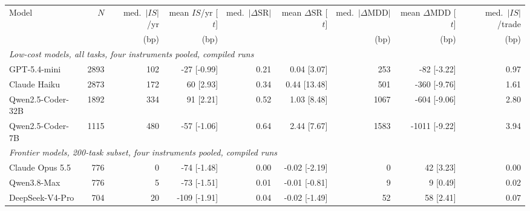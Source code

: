\begin{tabular}{lrrrrrrrr}
\toprule
Model & $N$ & med.\ $|IS|$/yr & mean $IS$/yr [$t$] & med.\ $|\Delta\mathrm{SR}|$ & mean $\Delta\mathrm{SR}$ [$t$] & med.\ $|\Delta\mathrm{MDD}|$ & mean $\Delta\mathrm{MDD}$ [$t$] & med.\ $|IS|$/trade \\
 & & (bp) & (bp) & & & (bp) & (bp) & (bp) \\
\midrule
\multicolumn{9}{l}{\emph{Low-cost models, all tasks, four instruments pooled, compiled runs}} \\
GPT-5.4-mini & 2893 & 102 & -27 [-0.99] & 0.21 & 0.04 [3.07] & 253 & -82 [-3.22] & 0.97 \\
Claude Haiku & 2873 & 172 & 60 [2.93] & 0.34 & 0.44 [13.48] & 501 & -360 [-9.76] & 1.61 \\
Qwen2.5-Coder-32B & 1892 & 334 & 91 [2.21] & 0.52 & 1.03 [8.48] & 1067 & -604 [-9.06] & 2.80 \\
Qwen2.5-Coder-7B & 1115 & 480 & -57 [-1.06] & 0.64 & 2.44 [7.67] & 1583 & -1011 [-9.22] & 3.94 \\
\midrule
\multicolumn{9}{l}{\emph{Frontier models, 200-task subset, four instruments pooled, compiled runs}} \\
Claude Opus 5.5 & 776 & 0 & -74 [-1.48] & 0.00 & -0.02 [-2.19] & 0 & 42 [3.23] & 0.00 \\
Qwen3.8-Max & 776 & 5 & -73 [-1.51] & 0.01 & -0.01 [-0.81] & 9 & 9 [0.49] & 0.02 \\
DeepSeek-V4-Pro & 704 & 20 & -109 [-1.91] & 0.04 & -0.02 [-1.49] & 52 & 58 [2.41] & 0.07 \\
\bottomrule
\end{tabular}
